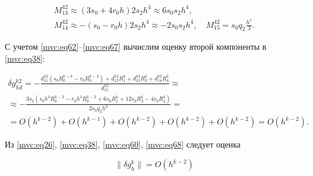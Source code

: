 \begin{gather}
\\

\label{mvc:eq67}  

M_{13}^{42}\approx

  (3s_0+4r_0h)2s_2h^4\approx  6s_0s_2h^4,



\\

\label{mvc:eq67}

M_{14}^{42}\approx

  -(s_0-r_0h)2s_2h^4\approx  -2s_0s_2h^4,\quad 

  M_{15}^{42}=s_0q_2\frac{h^{7}}{3}.

\end{gather}



С учетом \eqref{mvc:eq62}--\eqref{mvc:eq67} вычислим оценку второй компоненты в  \eqref{mvc:eq38}:

\begin{multline}

\label{mvc:eq68}

   \delta g_{hd}^{k2}=

-\frac{d_{11}^{k2} (s_0 R_{0}^{k-3}-r_0 R_{0}^{k-2})+ d_{12}^{k2} R_{1}^k + d_{13}^{k2} R_{3}^k + d_{14}^{k2} R_{4}^k}{d_{15}^{k2}}\approx

\\

\approx-\frac{3s_2 (s_0h^3 R_{0}^{k-3}-r_0h^3 R_{0}^{k-2}+ 6s_0 R_{1}^{k}+12s_0 R_{3}^{k}-4s_0 R_{4}^{k})}{2s_0q_2h^{3}}=

\\

=O(h^{k-2}) + O(h^{k-1}) + O(h^{k-2}) + O(h^{k-2}) + O(h^{k-2})=O(h^{k-2}).

\end{multline}





Из \eqref{mvc:eq26}, \eqref{mvc:eq38}, \eqref{mvc:eq60}, \eqref{mvc:eq68} следует оценка 

\begin{equation}

\label{mvc:eq69}

\|\delta g_h^k\|=O(h^{k-2})

\end{equation}

